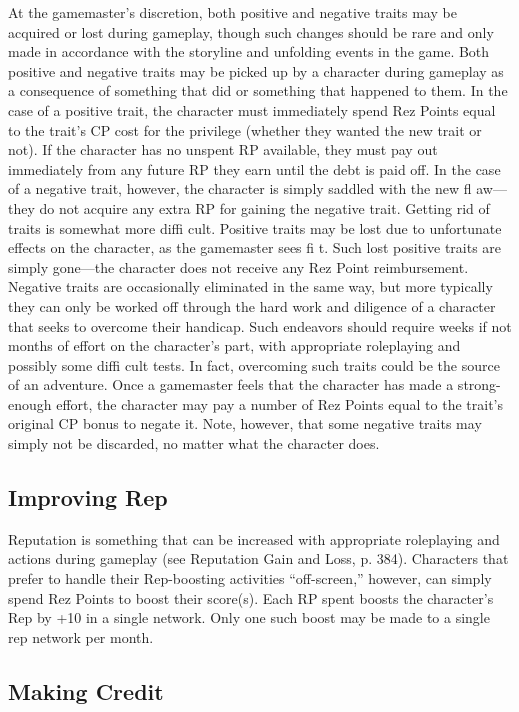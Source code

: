 At the gamemaster’s discretion, both positive and negative traits may be acquired or lost during gameplay, though such changes should be rare and only made in accordance with the storyline and unfolding events in the game. Both positive and negative traits may be picked up by a character during gameplay as a consequence of something that did or something that happened to them. In the case of a positive trait, the character must immediately spend Rez Points equal to the trait’s CP cost for the privilege (whether they wanted the new trait or not). If the character has no unspent RP available, they must pay out immediately from any future RP they earn until the debt is paid off. In the case of a negative trait, however, the character is simply saddled with the new fl aw—they do not acquire any extra RP for gaining the negative trait. Getting rid of traits is somewhat more diffi cult. Positive traits may be lost due to unfortunate effects on the character, as the gamemaster sees fi t. Such lost positive traits are simply gone—the character does not receive any Rez Point reimbursement. Negative traits are occasionally eliminated in the same way, but more typically they can only be worked off through the hard work and diligence of a character that seeks to overcome their handicap. Such endeavors should require weeks if not months of effort on the character’s part, with appropriate roleplaying and possibly some diffi cult tests. In fact, overcoming such traits could be the source of an adventure. Once a gamemaster feels that the character has made a strong-enough effort, the character may pay a number of Rez Points equal to the trait’s original CP bonus to negate it. Note, however, that some negative traits may simply not be discarded, no matter what the character does. 

\subsection{Improving Rep} \label{sec:improving-rep} 

Reputation is something that can be increased with appropriate roleplaying and actions during gameplay (see Reputation Gain and Loss, p. 384). Characters that prefer to handle their Rep-boosting activities “off-screen,” however, can simply spend Rez Points to boost their score(s). Each RP spent boosts the character’s Rep by +10 in a single network. Only one such boost may be made to a single rep network per month. 

\subsection{Making Credit} \label{sec:making-credit} 

